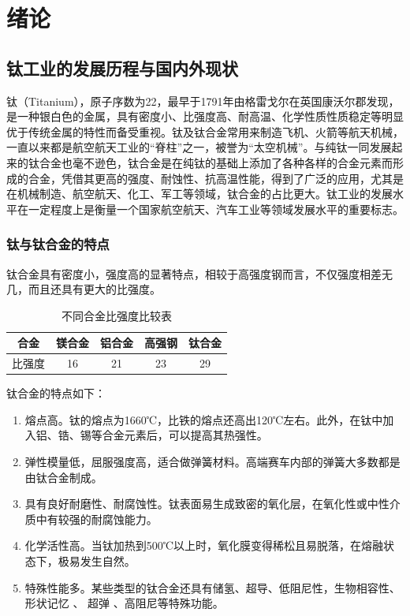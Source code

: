 \chapter{绪论}
\section{钛工业的发展历程与国内外现状}

钛（Titanium），原子序数为22，最早于1791年由格雷戈尔在英国康沃尔郡发现，是一种银白色的金属，具有密度小、比强度高、耐高温、化学性质性质稳定等明显优于传统金属的特性而备受重视。钛及钛合金常用来制造飞机、火箭等航天机械，一直以来都是航空航天工业的“脊柱”之一，被誉为“太空机械”\cite{XJYS200102014}。与纯钛一同发展起来的钛合金也毫不逊色，钛合金是在纯钛的基础上添加了各种各样的合金元素而形成的合金，凭借其更高的强度、耐蚀性、抗高温性能，得到了广泛的应用，尤其是在机械制造、航空航天、化工、军工等领域，钛合金的占比更大。钛工业的发展水平在一定程度上是衡量一个国家航空航天、汽车工业等领域发展水平的重要标志\cite{HSJJ202109005}。

\subsection{钛与钛合金的特点}
钛合金具有密度小，强度高的显著特点，相较于高强度钢而言，不仅强度相差无几，而且还具有更大的比强度。

\begin{table}[htbp]
	\centering
	\label{sec:bqd}
	\caption{不同合金比强度比较表}
	\begin{tabular}{ccccc}
		\toprule
		\textbf{合金} & \textbf{镁合金} & \textbf{铝合金} & \textbf{高强钢} & \textbf{钛合金} \\
		\midrule
		比强度 & 16 & 21 & 23 & 29 \\
		\bottomrule
	\end{tabular}
\end{table}

钛合金的特点如下\cite{1997titanium}：
\begin{enumerate}
	\item 熔点高。钛的熔点为1660℃，比铁的熔点还高出120℃左右。此外，在钛中加入铝、锆、锡等合金元素后，可以提高其热强性。
	\item 弹性模量低，屈服强度高，适合做弹簧材料。高端赛车内部的弹簧大多数都是由钛合金制成。
	\item 具有良好耐磨性、耐腐蚀性。钛表面易生成致密的氧化层，在氧化性或中性介质中有较强的耐腐蚀能力。
	\item 化学活性高。当钛加热到500℃以上时，氧化膜变得稀松且易脱落，在熔融状态下，极易发生自然。
	\item 特殊性能多。某些类型的钛合金还具有储氢、超导、低阻尼性，生物相容性、形状记忆 、 超弹 、高阻尼等特殊功能。
\end{enumerate}

